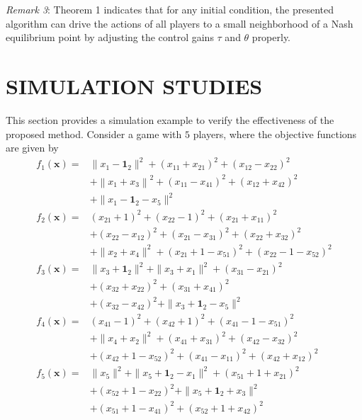 \documentclass[lettersize,journal]{IEEEtran}
\begin{document}
\emph{Remark 3}: Theorem 1 indicates that for any initial condition, the presented algorithm can drive the actions of all players to a small neighborhood of a Nash equilibrium point by adjusting the control gains $\tau$ and $\theta$ properly.



\section{SIMULATION STUDIES}
This section provides a simulation example to verify the effectiveness of the proposed method. Consider a game with $5$ players, where the objective functions are given by
\begin{equation*}
    \begin{aligned}
        f_1(\mathbf{x}) = & \|x_1-\mathbf{1}_2\|^2+(x_{11}+x_{21})^2+(x_{12}-x_{22})^2                                \\
                          & +\left\|x_1+x_3\right\|^2+\left(x_{11}-x_{41}\right)^2+\left(x_{12}+x_{42}\right)^2       \\
                          & +\|x_1-\mathbf{1}_2-x_5\|^2                                                               \\
        f_2(\mathbf{x}) = & (x_{21}+1)^2+(x_{22}-1)^2+(x_{21}+x_{11})^2                                               \\
                          & +(x_{22}-x_{12})^2+(x_{21}-x_{31})^2+(x_{22}+x_{32})^2                                    \\
                          & +\|x_2+x_4\|^2+(x_{21}+1-x_{51})^2+(x_{22}-1-x_{52})^2                                    \\
        f_3(\mathbf{x}) = & \|x_3+\mathbf{1}_2\|^2+\|x_3+x_1\|^2+(x_{31}-x_{21})^2                                    \\
                          & +(x_{32}+x_{22})^2+(x_{31}+x_{41})^2                                                      \\
                          & +(x_{32}-x_{42})^2+\|x_3+\mathbf{1}_2-x_5\|^2                                             \\
        f_4(\mathbf{x}) = & (x_{41}-1)^2+(x_{42}+1)^2+(x_{41}-1-x_{51})^2                                             \\
                          & +\|x_4+x_2\|^2+(x_{41}+x_{31})^2+(x_{42}-x_{32})^2                                        \\
                          & +\left(x_{42}+1-x_{52}\right)^2+\left(x_{41}-x_{11}\right)^2+\left(x_{42}+x_{12}\right)^2 \\
        f_5(\mathbf{x}) = & \|x_5\|^2+\|x_5+\mathbf{1}_2-x_1\|^2+(x_{51}+1+x_{21})^2                                  \\
                          & +(x_{52}+1-x_{22})^2+\|x_5+\mathbf{1}_2+x_3\|^2                                           \\
                          & +(x_{51}+1-x_{41})^2+(x_{52}+1+x_{42})^2
    \end{aligned}
\end{equation*}
\end{document}
